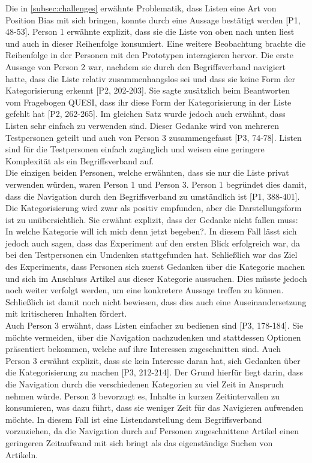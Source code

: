 Die in \autoref{subsec:challenges} erwähnte Problematik, dass Listen eine Art von Position Bias mit sich bringen, konnte durch eine Aussage bestätigt werden [P1, 48-53].
Person 1 erwähnte explizit, dass sie die Liste von oben nach unten liest und auch in dieser Reihenfolge konsumiert.
Eine weitere Beobachtung brachte die Reihenfolge in der Personen mit den Prototypen interagieren hervor.
Die erste Aussage von Person 2 war, nachdem sie durch den Begriffsverband navigiert hatte, dass die Liste \glqq relativ zusammenhangslos\grqq{} sei und dass sie keine Form der Kategorisierung erkennt [P2, 202-203].
Sie sagte zusätzlich beim Beantworten vom Fragebogen \ac{QUESI}, dass ihr diese Form der Kategorisierung in der Liste gefehlt hat [P2, 262-265].
Im gleichen Satz wurde jedoch auch erwähnt, dass Listen sehr einfach zu verwenden sind.
Dieser Gedanke wird von mehreren Testpersonen geteilt und auch von Person 3 zusammengefasst [P3, 74-78].
Listen sind für die Testpersonen einfach zugänglich und weisen eine geringere Komplexität als ein Begriffsverband auf.\\

Die einzigen beiden Personen, welche erwähnten, dass sie nur die Liste privat verwenden würden, waren Person 1 und Person 3.
Person 1 begründet dies damit, dass die Navigation durch den Begriffsverband zu umständlich ist [P1, 388-401].
Die Kategorisierung wird zwar als positiv empfunden, aber die Darstellungsform ist zu unübersichtlich.
Sie erwähnt explizit, dass der Gedanke nicht fallen muss: \glqq In welche Kategorie will ich mich denn jetzt begeben?\grqq{}.
In diesem Fall lässt sich jedoch auch sagen, dass das Experiment auf den ersten Blick erfolgreich war, da bei den Testpersonen ein Umdenken stattgefunden hat.
Schließlich war das Ziel des Experiments, dass Personen sich zuerst Gedanken über die Kategorie machen und sich im Anschluss Artikel aus dieser Kategorie aussuchen.
Dies müsste jedoch noch weiter verfolgt werden, um eine konkretere Aussage treffen zu können.
Schließlich ist damit noch nicht bewiesen, dass dies auch eine Auseinandersetzung mit kritischeren Inhalten fördert.\\

Auch Person 3 erwähnt, dass Listen einfacher zu bedienen sind [P3, 178-184].
Sie möchte vermeiden, über die Navigation nachzudenken und stattdessen Optionen präsentiert bekommen, welche auf ihre Interessen zugeschnitten sind.
Auch Person 3 erwähnt explizit, dass sie kein Interesse daran hat, sich Gedanken über die Kategorisierung zu machen [P3, 212-214].
Der Grund hierfür liegt darin, dass die Navigation durch die verschiedenen Kategorien zu viel Zeit in Anspruch nehmen würde.
Person 3 bevorzugt es, Inhalte in kurzen Zeitintervallen zu konsumieren, was dazu führt, dass sie weniger Zeit für das Navigieren aufwenden möchte.
In diesem Fall ist eine Listendarstellung dem Begriffsverband vorzuziehen, da die Navigation durch auf Personen zugeschnittene Artikel einen geringeren Zeitaufwand mit sich bringt als das eigenständige Suchen von Artikeln.

